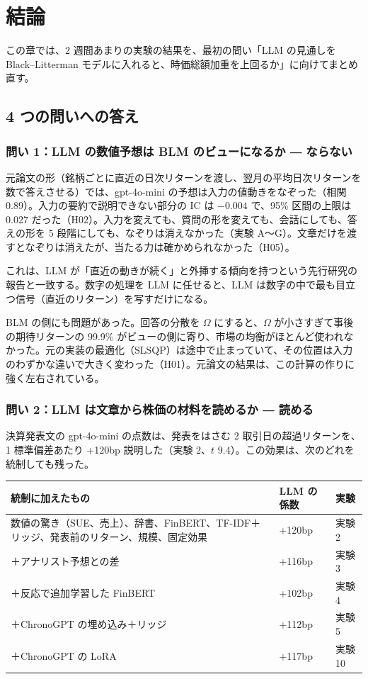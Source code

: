 \chapter{結論}\label{ch:conclusion}

この章では、2 週間あまりの実験の結果を、最初の問い「LLM の見通しを Black--Litterman モデルに入れると、時価総額加重を上回るか」に向けてまとめ直す。

\section{4 つの問いへの答え}

\subsection{問い 1：LLM の数値予想は BLM のビューになるか ― ならない}

元論文の形（銘柄ごとに直近の日次リターンを渡し、翌月の平均日次リターンを数で答えさせる）では、gpt-4o-mini の予想は入力の値動きをなぞった（相関 0.89）。入力の要約で説明できない部分の IC は $-0.004$ で、95\% 区間の上限は 0.027 だった（H02）。入力を変えても、質問の形を変えても、会話にしても、答えの形を 5 段階にしても、なぞりは消えなかった（実験 A〜G）。文章だけを渡すとなぞりは消えたが、当たる力は確かめられなかった（H05）。

これは、LLM が「直近の動きが続く」と外挿する傾向を持つという先行研究の報告と一致する。数字の処理を LLM に任せると、LLM は数字の中で最も目立つ信号（直近のリターン）を写すだけになる。

BLM の側にも問題があった。回答の分散を $\Omega$ にすると、$\Omega$ が小さすぎて事後の期待リターンの 99.9\% がビューの側に寄り、市場の均衡がほとんど使われなかった。元の実装の最適化（SLSQP）は途中で止まっていて、その位置は入力のわずかな違いで大きく変わった（H01）。元論文の結果は、この計算の作りに強く左右されている。

\subsection{問い 2：LLM は文章から株価の材料を読めるか ― 読める}

決算発表文の gpt-4o-mini の点数は、発表をはさむ 2 取引日の超過リターンを、1 標準偏差あたり +120bp 説明した（実験 2、$t$ 9.4）。この効果は、次のどれを統制しても残った。

\begin{longtable}{P{6.0cm}P{3.0cm}P{5.4cm}}
\toprule
\textbf{統制に加えたもの} & \textbf{LLM の係数} & \textbf{実験} \\
\midrule
\endhead
\bottomrule
\endfoot
数値の驚き（SUE、売上）、辞書、FinBERT、TF-IDF＋リッジ、発表前のリターン、規模、固定効果 & +120bp & 実験 2 \\
＋アナリスト予想との差 & +116bp & 実験 3 \\
＋反応で追加学習した FinBERT & +102bp & 実験 4 \\
＋ChronoGPT の埋め込み＋リッジ & +112bp & 実験 5 \\
＋ChronoGPT の LoRA & +117bp & 実験 10 \\
\end{longtable}

